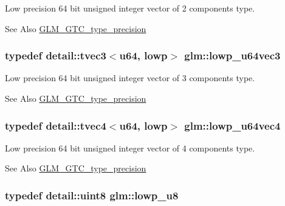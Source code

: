 Low precision 64 bit unsigned integer vector of 2 components type. \begin{DoxySeeAlso}{See Also}
\hyperlink{group__gtc__type__precision}{G\-L\-M\-\_\-\-G\-T\-C\-\_\-type\-\_\-precision} 
\end{DoxySeeAlso}
\hypertarget{group__gtc__type__precision_gaa62794e3f055a333a85c0e52376f2429}{
\subsubsection[{lowp\-\_\-u64vec3}]{\setlength{\rightskip}{0pt plus 5cm}typedef detail\-::tvec3$<$u64, lowp$>$ {\bf glm\-::lowp\-\_\-u64vec3}}}\label{group__gtc__type__precision_gaa62794e3f055a333a85c0e52376f2429}
Low precision 64 bit unsigned integer vector of 3 components type. \begin{DoxySeeAlso}{See Also}
\hyperlink{group__gtc__type__precision}{G\-L\-M\-\_\-\-G\-T\-C\-\_\-type\-\_\-precision} 
\end{DoxySeeAlso}
\hypertarget{group__gtc__type__precision_ga1dc6d791a39dc52ee296a891d5b9b084}{
\subsubsection[{lowp\-\_\-u64vec4}]{\setlength{\rightskip}{0pt plus 5cm}typedef detail\-::tvec4$<$u64, lowp$>$ {\bf glm\-::lowp\-\_\-u64vec4}}}\label{group__gtc__type__precision_ga1dc6d791a39dc52ee296a891d5b9b084}
Low precision 64 bit unsigned integer vector of 4 components type. \begin{DoxySeeAlso}{See Also}
\hyperlink{group__gtc__type__precision}{G\-L\-M\-\_\-\-G\-T\-C\-\_\-type\-\_\-precision} 
\end{DoxySeeAlso}
\hypertarget{group__gtc__type__precision_gae63f942c49a30dbf266b2f13f3efe257}{
\subsubsection[{lowp\-\_\-u8}]{\setlength{\rightskip}{0pt plus 5cm}typedef detail\-::uint8 {\bf glm\-::lowp\-\_\-u8}}}\label{group__gtc__type__precision_gae63f942c49a30dbf266b2f13f3efe257}
